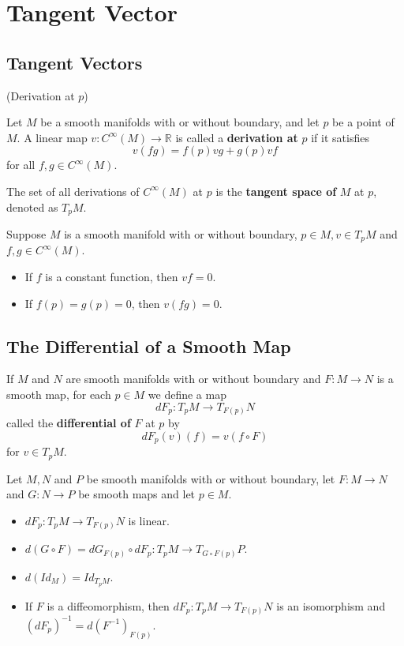 \section{Tangent Vector}

\subsection{Tangent Vectors}

\begin{definition}(Derivation at $p$)\par
    Let $M$ be a smooth manifolds with or without boundary, and let $p$ be a point of $M$. A linear map $v:C^{\infty}(M) \to \mathbb{R}$ is called a \textbf{derivation at }$p$ if it satisfies
    \[v(fg) = f(p)vg + g(p)vf\]
    for all $f,g\in C^{\infty}(M)$.\par
    The set of all derivations of $C^{\infty}(M)$ at $p$ is the \textbf{tangent space of }$M$ at $p$, denoted as $T_pM$.
\end{definition}

\begin{lemma}
    Suppose $M$ is a smooth manifold with or without
    boundary, $p\in M, v\in T_pM$ and $f,g \in C^{\infty}(M)$.
    \begin{itemize}
        \item If $f$ is a constant function, then $vf = 0$.
        \item If $f(p) = g(p) = 0$, then $v(fg) = 0$. 
    \end{itemize}
\end{lemma}

\subsection{The Differential of a Smooth Map}

\begin{definition}
    If $M$ and $N$ are smooth manifolds with or without boundary and $F:M\to N$ is a smooth map, for each $p\in M$ we define a map
    \[dF_p: T_pM\to T_{F(p)}N\]
    called the \textbf{differential of} $F$ at $p$ by
    \[dF_p(v)(f) = v(f\circ F)\]
    for $v\in T_pM$.
\end{definition}

\begin{proposition}
    Let $M,N$ and $P$ be smooth manifolds with or without boundary, let $F:M\to N$ and $G:N\to P$ be smooth maps and let $p\in M$.
    \begin{itemize}
        \item $dF_p:T_pM\to T_{F(p)}N$ is linear.
        \item $d(G\circ F) = dG_{F(p)}\circ dF_p: T_pM\to T_{G\circ F(p)}P$.
        \item $d(Id_M) = Id_{T_pM}$.
        \item If $F$ is a diffeomorphism, then $dF_p:T_pM\to T_{F(p)}N$ is an isomorphism and $(dF_p)^{-1} = d(F^{-1})_{F(p)}$.
    \end{itemize}
\end{proposition}

